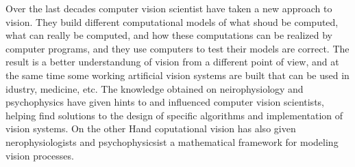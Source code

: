  
 Over the last decades computer vision scientist have taken a new approach to vision. They build different computational models of what shoud be computed, what can really be computed, and how these computations can be realized by computer programs, and they use computers to test their models are correct. The result is a better understandung of vision from a different point of view, and at the same time some working artificial vision systems are built that can be used in idustry, medicine, etc. The knowledge obtained on neirophysiology and psychophysics have given hints to and influenced computer vision scientists, helping find solutions to the design of specific algorithms and implementation of vision systems. On the other Hand coputational vision has also given nerophysiologists and psychophysicsist a mathematical framework for modeling vision processes.\cite{ZZGXr}